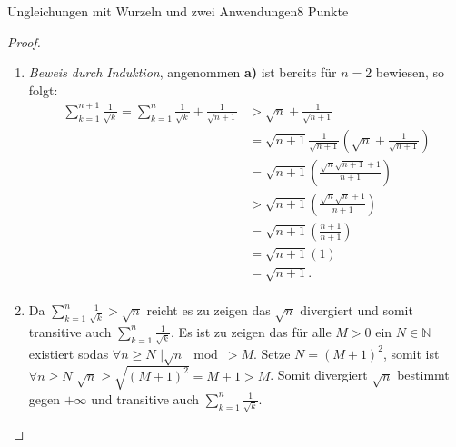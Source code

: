 \documentclass{../problemset}
\begin{document}
\begin{problem}{Ungleichungen mit Wurzeln und zwei Anwendungen}{8 Punkte}
\begin{proof}
	\begin{enumerate}
		\item \textit{Beweis durch Induktion}, angenommen \textbf{a)} ist bereits für $n=2$ bewiesen, so folgt: \begin{align*}
			      \sum_{k=1}^{n+1} \frac{1}{\sqrt{k}} = \sum_{k=1}^{n} \frac{1}{\sqrt{k}} + \frac{1}{\sqrt{n + 1}} & > \sqrt{n} + \frac{1}{\sqrt{n + 1}}                                              \\
			                                                                                                       & = \sqrt{n+1} \frac{1}{\sqrt{n+1}} \left(\sqrt{n} + \frac{1}{\sqrt{n + 1}}\right) \\
			                                                                                                       & = \sqrt{n+1} \left(\frac{\sqrt{n}\sqrt{n+1} + 1}{n + 1}\right)                   \\
			                                                                                                       & > \sqrt{n+1} \left(\frac{\sqrt{n}\sqrt{n} + 1}{n + 1}\right)                     \\
			                                                                                                       & = \sqrt{n+1} \left(\frac{n + 1}{n + 1}\right)                                    \\
			                                                                                                       & = \sqrt{n+1} (1)                                                                 \\
			                                                                                                       & = \sqrt{n+1} \tag*{\checkmark}.                                                  \\
		      \end{align*}
		\item Da $\sum_{k=1}^{n} \frac{1}{\sqrt{k}} > \sqrt{n}$ reicht es zu zeigen das $\sqrt{n}$ divergiert und somit transitive auch $\sum_{k=1}^{n} \frac{1}{\sqrt{k}}$.
		      Es ist zu zeigen das für alle $M > 0$ ein $N \in \mathbb{N}$ existiert sodas $\forall n \ge N$ $\mid \sqrt{n} \mod > M$.
		      Setze $N = {(M + 1)}^2$, somit ist $\forall n \ge N$ $\sqrt{n} \ge \sqrt{{(M + 1)}^2} = M+1 > M$.
		      Somit divergiert $\sqrt{n}$ bestimmt gegen $+\infty$ und transitive auch $\sum_{k=1}^{n} \frac{1}{\sqrt{k}}$.
		      \checkmark
	\end{enumerate}
\end{proof}


\end{problem}
\end{document}
